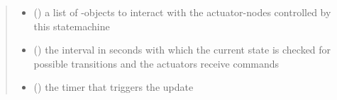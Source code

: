 \documentclass[a4paper,12pt,twoside]{article}
\begin{document}
\begin{fulllineitems}
\begin{quote}
\begin{description}
\begin{itemize}
\item {} 
 (\sphinxstyleliteralemphasis{\sphinxupquote{{[}}}{\hyperref[\detokenize{osbk_operation:osbk_operation.actuator_state_machine.ActuatorEntry}]{\sphinxcrossref{\sphinxstyleliteralemphasis{\sphinxupquote{ActuatorEntry}}}}}\sphinxstyleliteralemphasis{\sphinxupquote{{]}}}) \textendash{} a list of -objects to interact with the actuator-nodes
controlled by this statemachine

\item {} 
 () \textendash{} the interval in seconds with which the current state is checked for possible
transitions and the actuators receive commands

\item {} 
 () \textendash{} the timer that triggers the update

\end{itemize}

\end{description}\end{quote}

\end{fulllineitems}

\label{\detokenize{osbk_operation:module-osbk_operation.utility}}
\end{document}
